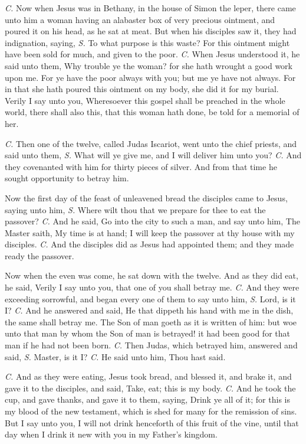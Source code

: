 \textit{C.} Now when Jesus was in Bethany, in the house of Simon the leper, there came unto him a woman having an alabaster box of very precious ointment, and poured it on his head, as he sat at meat. But when his disciples saw it, they had indignation, saying, \textit{S.} To what purpose is this waste? For this ointment might have been sold for much, and given to the poor. \textit{C.} When Jesus understood it, he said unto them, {} Why trouble ye the woman? for she hath wrought a good work upon me. For ye have the poor always with you; but me ye have not always. For in that she hath poured this ointment on my body, she did it for my burial. Verily I say unto you, Wheresoever this gospel shall be preached in the whole world, there shall also this, that this woman hath done, be told for a memorial of her.

\textit{C.} Then one of the twelve, called Judas Iscariot, went unto the chief priests, and said unto them, \textit{S.} What will ye give me, and I will deliver him unto you? \textit{C.} And they covenanted with him for thirty pieces of silver. And from that time he sought opportunity to betray him.

Now the first day of the feast of unleavened bread the disciples came to Jesus, saying unto him, \textit{S.} Where wilt thou that we prepare for thee to eat the passover? \textit{C.} And he said, {} Go into the city to such a man, and say unto him, The Master saith, My time is at hand; I will keep the passover at thy house with my disciples. \textit{C.} And the disciples did as Jesus had appointed them; and they made ready the passover.

Now when the even was come, he sat down with the twelve. And as they did eat, he said, {} Verily I say unto you, that one of you shall betray me. \textit{C.} And they were exceeding sorrowful, and began every one of them to say unto him, \textit{S.} Lord, is it I? \textit{C.} And he answered and said, {} He that dippeth his hand with me in the dish, the same shall betray me. The Son of man goeth as it is written of him: but woe unto that man by whom the Son of man is betrayed! it had been good for that man if he had not been born. \textit{C.} Then Judas, which betrayed him, answered and said, \textit{S.} Master, is it I? \textit{C.} He said unto him, {} Thou hast said.

\textit{C.} And as they were eating, Jesus took bread, and blessed it, and brake it, and gave it to the disciples, and said, {} Take, eat; this is my body. \textit{C.} And he took the cup, and gave thanks, and gave it to them, saying, {} Drink ye all of it; for this is my blood of the new testament, which is shed for many for the remission of sins. But I say unto you, I will not drink henceforth of this fruit of the vine, until that day when I drink it new with you in my Father’s kingdom.

